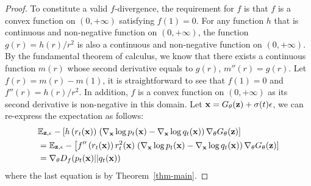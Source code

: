 \mainprop*

\begin{proof}
    To constitute a valid $f$-divergence, the requirement for $f $ is that  $f$ is a convex function on $(0,+\infty)$ satisfying $f(1)=0$. For any function $h$ that is continuous and non-negative function on $(0, +\infty)$, the function $g(r) = h(r)/r^2$ is also a continuous and non-negative function on $(0, +\infty)$. By the fundamental theorem of calculus, we know that there exists a continuous function $m(r)$ whose second derivative equals to $g(r)$, \ie $m''(r) = g(r)$. Let $f(r) = m(r) - m(1)$, it is straightforward to see that $f(1)=0$ and $f''(r)=h(r)/r^2$. In addition, $f$ is a convex function on $(0, +\infty)$ as its second derivative is non-negative in this domain. Let $ {\mathbf{x}} = G_\theta({\mathbf{z}})+\sigma(t)\epsilon $, we can re-express the expectation as follows:
    \begin{align*}
        &\mathbb{E}_{\substack{{\mathbf{z}},  \epsilon}}-\left[h\left(r_t({\mathbf{x}})\right)\right.\left({\nabla_{\mathbf{x}} \log p_t({\mathbf{x}})} - {\nabla_{\mathbf{x}} \log q_t({\mathbf{x}})} \right)  \nabla_\theta G_\theta({\mathbf{z}})] \\
        &= \mathbb{E}_{\substack{{\mathbf{z}},  \epsilon}}-\left[f''\left(r_t({\mathbf{x}})\right)r^2_t({\mathbf{x}})\right.\left({\nabla_{\mathbf{x}} \log p_t({\mathbf{x}})} - {\nabla_{\mathbf{x}} \log q_t({\mathbf{x}})} \right)  \nabla_\theta G_\theta({\mathbf{z}})] \\
        &= \nabla_\theta D_f(p_t({\mathbf{x}})||q_t({\mathbf{x}})) 
    \end{align*}
    where the last equation is by Theorem~\ref{thm-main}.
\end{proof}
